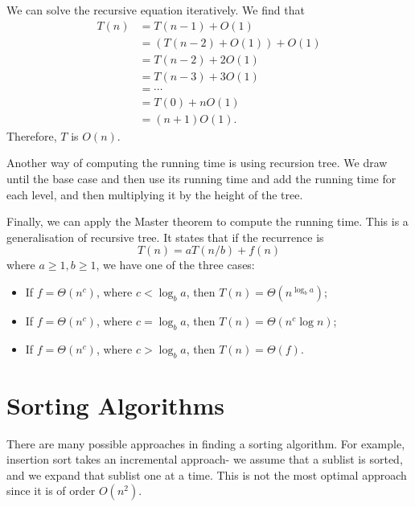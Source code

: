 \documentclass[a4paper, openany]{memoir}
\begin{document}
\noindent We can solve the recursive equation iteratively. We find that
\begin{align*}
    T(n) &= T(n-1) + O(1) \\
    &= (T(n-2) + O(1)) + O(1) \\
    &= T(n-2) + 2O(1) \\
    &= T(n-3) + 3O(1) \\
    &= \cdots \\
    &= T(0) + nO(1) \\
    &= (n+1)O(1).
\end{align*}
Therefore, $T$ is $O(n)$. 

\noindent Another way of computing the running time is using recursion tree. We draw until the base case and then use its running time and add the running time for each level, and then multiplying it by the height of the tree.

\noindent Finally, we can apply the Master theorem to compute the running time. This is a generalisation of recursive tree. It states that if the recurrence is
\[T(n) = aT(n/b) + f(n)\]
where $a \geq 1, b \geq 1$, we have one of the three cases:
\begin{itemize}
    \item If $f = \Theta(n^c)$, where $c < \log_b a$, then $T(n) = \Theta(n^{\log_b a})$;
    \item If $f = \Theta(n^c)$, where $c = \log_b a$, then $T(n) = \Theta(n^c \log n)$;
    \item If $f = \Theta(n^c)$, where $c > \log_b a$, then $T(n) = \Theta(f)$.
\end{itemize}
\newpage

\section{Sorting Algorithms}
There are many possible approaches in finding a sorting algorithm. For example, insertion sort takes an incremental approach- we assume that a sublist is sorted, and we expand that sublist one at a time. This is not the most optimal approach since it is of order $O(n^2)$.
\end{document}
